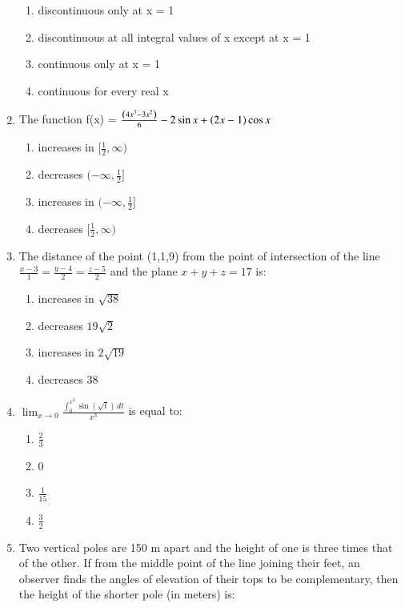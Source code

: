 \documentclass[journal]{IEEEtran}
\numberwithin{equation}{enumi}
\numberwithin{figure}{enumi}
\begin{document}
\begin{enumerate}
    \begin{enumerate}
        \item discontinuous only at x = 1
        \item discontinuous at all integral values of x except at x = 1
        \item continuous only at x = 1
        \item continuous for every real x
    \end{enumerate}
    \item The function f(x) = $\frac{\left(4x^3 - 3x^2\right)}{6} - 2\sin{x} + \left(2x -1\right)\cos{x}$ \\
    \begin{enumerate}
        \item increases in $[\frac{1}{2},\infty)$
        \item decreases $(-\infty,\frac{1}{2}]$
        \item increases in $(-\infty,\frac{1}{2}]$
        \item decreases  $[\frac{1}{2},\infty)$
    \end{enumerate}
    \item The distance of the point (1,1,9) from the point of intersection of the line $\frac{x - 3}{1} = \frac{y - 4}{2} = \frac{z - 5}{2}$ and the plane $x + y + z = 17$ is: \\
    \begin{enumerate}
        \item increases in $\sqrt{38}$
        \item decreases $19\sqrt{2}$
        \item increases in $2\sqrt{19}$
        \item decreases  $38$
    \end{enumerate}
    \item $\lim_{x \to 0} \frac{\int_{0}^{x^2} \sin(\sqrt{t}) \, dt}{x^3}$ is equal to: \\
    \begin{multicols}{4}
    \begin{enumerate}
        \item $\frac{2}{3}$
        \item 0
        \item $\frac{1}{15}$
        \item $\frac{3}{2}$
    \end{enumerate}
    \end{multicols}
    \item Two vertical poles are 150 m apart and the height of one is three times that of the other. If from the middle point of the line joining their feet, an observer finds the angles of elevation of their tops to be complementary, then the height of the shorter pole (in meters) is: \\

\end{enumerate}
\end{document}
